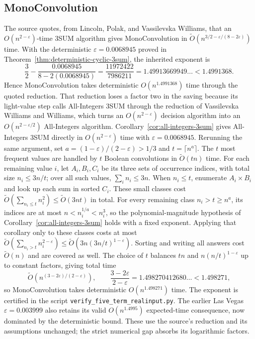 \documentclass[11pt]{article}
\newcommand{\softO}{\widetilde O}
\begin{document}
\subsection*{MonoConvolution}
The source quotes, from Lincoln, Polak, and Vassilevska Williams, that an
$O(n^{2-\varepsilon})$-time 3SUM algorithm gives MonoConvolution in
$\softO(n^{3/2-\varepsilon/(8-2\varepsilon)})$ time. With the deterministic
$\varepsilon=0.0068945$ proved in
Theorem~\ref{thm:deterministic-cyclic-3sum}, the inherited exponent is
\[
 \frac32-\frac{0.0068945}{8-2(0.0068945)}
 =\frac{11972422}{7986211}
 =1.49913669949\ldots<1.4991368.
\]
Hence MonoConvolution takes deterministic $O(n^{1.4991368})$ time through
the quoted reduction. That reduction loses a factor two in the saving
because its light-value step calls All-Integers 3SUM through the
reduction of Vassilevska Williams and Williams, which turns an
$O(n^{2-\varepsilon})$ decision algorithm into an
$O(n^{2-\varepsilon/2})$ All-Integers algorithm.
Corollary~\ref{cor:all-integers-3sum} gives All-Integers 3SUM directly in
$O(n^{2-\varepsilon})$ time with $\varepsilon=0.0068945$. Rerunning the
same argument, set $a=(1-\varepsilon)/(2-\varepsilon)>1/3$ and
$t=\lceil n^a\rceil$. The $t$ most frequent values are handled by $t$
Boolean convolutions in $\softO(tn)$ time. For each remaining value $i$,
let $A_i,B_i,C_i$ be its three sets of occurrence indices, with total
size $n_i\le3n/t$; over all such values, $\sum_i n_i\le3n$.
When $n_i\le t$, enumerate $A_i\times B_i$ and look up each sum in
sorted $C_i$. These small classes cost
$\softO(\sum_{n_i\le t}n_i^2)\le\softO(3nt)$ in total.
For every remaining class $n_i>t\ge n^a$, its indices are at most
$n<n_i^{1/a}<n_i^3$, so the polynomial-magnitude hypothesis of
Corollary~\ref{cor:all-integers-3sum} holds with a fixed exponent.
Applying that corollary only to these classes costs at most
$\softO(\sum_{n_i>t}n_i^{2-\varepsilon})
\le\softO(3n(3n/t)^{1-\varepsilon})$. Sorting and writing all answers
cost $\softO(n)$ and are covered as well. The choice of $t$ balances
$tn$ and $n(n/t)^{1-\varepsilon}$ up to constant factors, giving total time
\[
\softO\!\left(n^{(3-2\varepsilon)/(2-\varepsilon)}\right),\qquad
\frac{3-2\varepsilon}{2-\varepsilon}=1.498270412680\ldots<1.498271,
\]
so MonoConvolution takes deterministic $O(n^{1.498271})$ time. The
exponent is certified in the script
\texttt{verify\_five\_\allowbreak term\_\allowbreak realinput.py}.
The earlier Las Vegas $\varepsilon=0.003999$ also retains its valid
$O(n^{1.4995})$ expected-time consequence, now dominated by the
deterministic bound. These use the source's
reduction and its assumptions unchanged; the strict numerical gap
absorbs its logarithmic factors.
\end{document}
